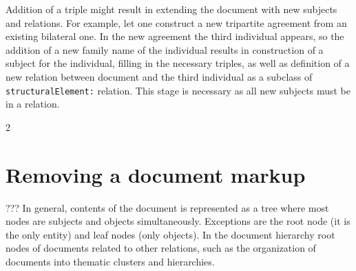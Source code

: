 \documentclass[conference]{IEEEtran}
\begin{document}
Addition of a triple might result in extending the document with new
subjects and relations.  For example, let one construct a new tripartite
agreement from an existing bilateral one.  In the new agreement the
third individual appears, so the addition of a new family name of the
individual results in construction of a subject for the individual,
filling in the necessary triples, as well as definition of a new
relation between document and the third individual as a subclass of
\texttt{structuralElement:} relation.  This stage is necessary as all
new subjects must be in a relation.

 2
\section{Removing a document markup}

??? In general, contents of the document is represented as a tree where most nodes are subjects and objects simultaneously. Exceptions are the root node (it is the only entity) and leaf nodes (only objects). In the document hierarchy root nodes of documents related to other relations, such as the organization of documents into thematic clusters and hierarchies.
\end{document}
